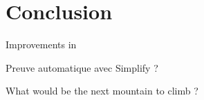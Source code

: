 \section{Conclusion}
\label{sec:conclusion}

Improvements in \caduceus{} 

Preuve automatique avec Simplify ?

What would be the next mountain to climb ?

